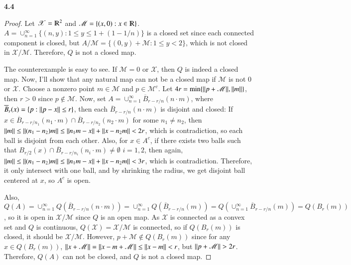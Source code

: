 \documentclass[a4paper, 12pt]{article}
\theoremstyle{Mydefinition}
\theoremstyle{Mytheorem}
\begin{document}
\noindent \textbf{4.4}
\begin{proof}
Let $\mathscr{X} = \varmathbb{R}^2$ and $\mathscr{M} = \{(x, 0):x\in\varmathbb{R}\}$. $A = \cup_{n=1}^\infty \{(n, y):1\leq y\leq 1+(1-1/n)\}$ is a closed set since each connected component is closed, but $A/\mathscr{M} = \{(0, y)+\mathscr{M}:1\leq y<2\}$, which is not closed in $\mathscr{X}/\mathscr{M}$. Therefore, $Q$ is not a closed map.

The counterexample is easy to see. If $\mathscr{M} = 0$ or $\mathscr{X}$, then $Q$ is indeed a closed map. Now, I'll show that any natural map can not be a closed map if $\mathscr{M}$ is not $0$ or $\mathscr{X}$. Choose a nonzero point $m\in \mathscr{M}$ and $p \in \mathscr{M}^c$. Let $4r = \min\{\norm{p+\mathscr{M}}, \norm{m}\}$, then $r>0$ since $p\notin \mathscr{M}$. Now, set $A=\cup_{n=1}^\infty \overline{B}_{r-r/n}(n\cdot m)$, where $\overline{B}_{r}(x) = \{p:\norm{p-x}\leq r\}$, then each $\overline{B}_{r-r/n}(n\cdot m)$ is disjoint and closed: 
If $x\in \overline{B}_{r-r/n_1}(n_1\cdot m) \cap \overline{B}_{r-r/n_2}(n_2\cdot m)$ for some $n_1\neq n_2$, then $\norm{m}\leq \norm{(n_1-n_2)m}\leq \norm{n_1 m -x} + \norm{x-n_2 m} <2r$, which is contradiction, so each ball is disjoint from each other. Also, for $x\in A^c$, if there exists two balls such that $B_{r/2}(x)\cap \overline{B}_{r-r/n_i}(n_i\cdot m)\neq \emptyset$ $i=1,2$, then again, $\norm{m}\leq \norm{(n_1-n_2)m}\leq \norm{n_1 m -x} + \norm{x-n_2 m} < 3r$, which is contradiction. Therefore, it only intersect with one ball, and by shrinking the radius, we get disjoint ball centered at $x$, so $A^c$ is open.

Also, $Q(A) = \cup_{n=1}^\infty Q(\overline{B}_{r-r/n}(n\cdot m)) = \cup_{n=1}^\infty Q(\overline{B}_{r-r/n}(m)) = Q(\cup_{n=1}^\infty\overline{B}_{r-r/n}(m)) = Q(B_{r}(m))$, so it is open in $\mathscr{X}/\mathscr{M}$ since $Q$ is an open map. As $\mathscr{X}$ is connected as a convex set and $Q$ is continuous, $Q(\mathscr{X})=\mathscr{X}/\mathscr{M}$ is connected, so if $Q(B_{r}(m))$ is closed, it should be $\mathscr{X}/\mathscr{M}$. However, $p + \mathscr{M}\notin Q(B_r(m))$ since for any $x\in Q(B_r(m))$, $\norm{x+\mathscr{M}} = \norm{x-m + \mathscr{M}}\leq\norm{x - m}<r$, but $\norm{p+\mathscr{M}}>2r$. Therefore, $Q(A)$ can not be closed, and $Q$ is not a closed map.
\end{proof}
\end{document}

